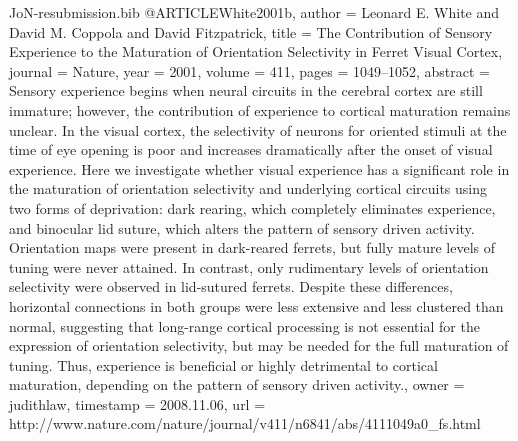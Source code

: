 \documentclass{article}
\begin{document}
\begin{filecontents}{JoN-resubmission.bib}
@ARTICLE{White2001b,
  author = {Leonard E. White and David M. Coppola and David Fitzpatrick},
  title = {The Contribution of Sensory Experience to the Maturation of Orientation
	Selectivity in Ferret Visual Cortex},
  journal = {Nature},
  year = {2001},
  volume = {411},
  pages = {1049--1052},
  abstract = {Sensory experience begins when neural circuits in the cerebral cortex
	are still immature; however, the contribution of experience to cortical
	maturation remains unclear. In the visual cortex, the selectivity
	of neurons for oriented stimuli at the time of eye opening is poor
	and increases dramatically after the onset of visual experience.
	Here we investigate whether visual experience has a significant role
	in the maturation of orientation selectivity and underlying cortical
	circuits using two forms of deprivation: dark rearing, which completely
	eliminates experience, and binocular lid suture, which alters the
	pattern of sensory driven activity. Orientation maps were present
	in dark-reared ferrets, but fully mature levels of tuning were never
	attained. In contrast, only rudimentary levels of orientation selectivity
	were observed in lid-sutured ferrets. Despite these differences,
	horizontal connections in both groups were less extensive and less
	clustered than normal, suggesting that long-range cortical processing
	is not essential for the expression of orientation selectivity, but
	may be needed for the full maturation of tuning. Thus, experience
	is beneficial or highly detrimental to cortical maturation, depending
	on the pattern of sensory driven activity.},
  owner = {judithlaw},
  timestamp = {2008.11.06},
  url = {http://www.nature.com/nature/journal/v411/n6841/abs/4111049a0_fs.html}
}


\end{filecontents}
\end{document}
